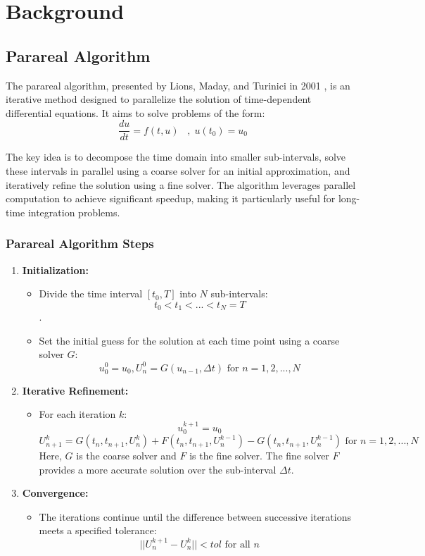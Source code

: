 \documentclass[a4paper,12pt,french]{article}
\begin{document}

\newpage
\section{Background}
\subsection{Parareal Algorithm}
The parareal algorithm, presented by Lions, Maday, and Turinici in 2001 \cite{lions2001resolution}, is an iterative method designed to parallelize the solution of time-dependent differential equations. It aims to solve problems of the form:
$$
\frac{du}{dt} = f(t,u) \;\;\;,\; u(t_0) = u_0
$$

The key idea is to decompose the time domain into smaller sub-intervals, solve these intervals in parallel using a coarse solver for an initial approximation, and iteratively refine the solution using a fine solver. The algorithm leverages parallel computation to achieve significant speedup, making it particularly useful for long-time integration problems.

\subsubsection*{Parareal Algorithm Steps}

\begin{enumerate}
    \item \textbf{Initialization:}
    \begin{itemize}
        \item Divide the time interval $[t_0,T]$ into $N$ sub-intervals: $$t_0<t_1<...<t_N=T$$.
        \item Set the initial guess for the solution at each time point using a coarse solver $G$:
            $$u^0_0=u_0,U^0_n=G(u_{n-1},\Delta t) \text{   for  } n=1,2,...,N$$
    \end{itemize}
    \item \textbf{Iterative Refinement:}
    \begin{itemize}
        \item For each iteration $k$:
        $$u^{k+1}_0=u_0$$
        $$ U_{n+1}^k = G(t_n,t_{n+1},U_n^k) + F(t_n,t_{n+1},U_n^{k-1}) -G(t_n,t_{n+1},U_n^{k-1})\text{   for  } n=1,2,...,N$$
        Here, $G$ is the coarse solver and $F$ is the fine solver. The fine solver $F$ provides a more accurate solution over the sub-interval $\Delta t$.
    \end{itemize}
    \item \textbf{Convergence:}
    \begin{itemize}
        \item The iterations continue until the difference between successive iterations meets a specified tolerance:
        $$||U_n^{k+1}-U_n^{k}|| < tol \text{  for all  } n$$
    \end{itemize}
\end{enumerate}
\end{document}
